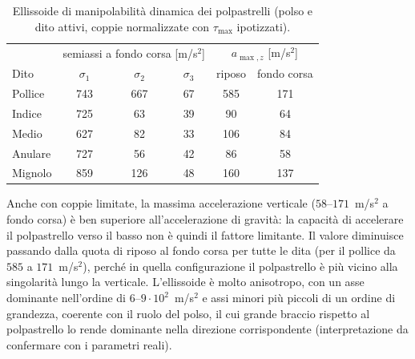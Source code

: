\begin{table}[htbp]
    \centering
    \renewcommand{\arraystretch}{1.1}
    \begin{tabular}{|l|ccc|cc|}
        \hline
        & \multicolumn{3}{c|}{semiassi a fondo corsa [m/s$^2$]} & \multicolumn{2}{c|}{$a_{\max,z}$ [m/s$^2$]}\\
        Dito & $\sigma_1$ & $\sigma_2$ & $\sigma_3$ & riposo & fondo corsa\\ \hline \hline
        Pollice & 743 & 667 & 67 & 585 & 171\\
        Indice & 725 & 63 & 39 & 90 & 64\\
        Medio & 627 & 82 & 33 & 106 & 84\\
        Anulare & 727 & 56 & 42 & 86 & 58\\
        Mignolo & 859 & 126 & 48 & 160 & 137\\ \hline
    \end{tabular}
    \caption{Ellissoide di manipolabilità dinamica dei polpastrelli (polso e dito attivi, coppie normalizzate con $\tau_{\max}$ ipotizzati).}
    \label{tab:dynellipsoid}
\end{table}

Anche con coppie limitate, la massima accelerazione verticale ($58$--$171$~m/s$^2$ a fondo corsa) è ben superiore all'accelerazione di gravità: la capacità di accelerare il polpastrello verso il basso non è quindi il fattore limitante. 
Il valore diminuisce passando dalla quota di riposo al fondo corsa per tutte le dita (per il pollice da $585$ a $171$~m/s$^2$), perché in quella configurazione il polpastrello è più vicino alla singolarità lungo la verticale. 
L'ellissoide è molto anisotropo, con un asse dominante nell'ordine di $6$--$9\cdot10^{2}$~m/s$^2$ e assi minori più piccoli di un ordine di grandezza, coerente con il ruolo del polso, il cui grande braccio rispetto al polpastrello lo rende dominante nella direzione corrispondente (interpretazione da confermare con i parametri reali).
